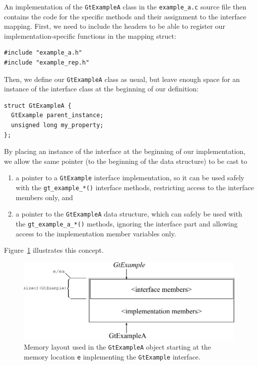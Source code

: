 \documentclass[11pt,final]{article}
\newcommand{\keyword}[1]{\lstinline{#1}}
\begin{document}
An implementation of the \keyword{GtExampleA} class in the \keyword{example_a.c}
source file then contains the code for the specific methods and their assignment
to the interface mapping. First, we need to include the headers to be able to
register our implementation-specific functions in the mapping struct:

\begin{lstlisting}
#include "example_a.h"
#include "example_rep.h"
\end{lstlisting}

Then, we define our \keyword{GtExampleA} class as usual, but leave enough space
for an instance of the interface class at the beginning of our definition:

\begin{lstlisting}
struct GtExampleA {
  GtExample parent_instance;
  unsigned long my_property;
};
\end{lstlisting}

By placing an instance of the interface at the beginning of our implementation,
we allow the same pointer (to the beginning of the data structure) to be cast to
\begin{enumerate}
\item
a pointer to a \keyword{GtExample} interface implementation, so it can be used
safely with the \keyword{gt_example_*()} interface methods, restricting access
to the interface members only, and
\item
a pointer to the \keyword{GtExampleA} data structure, which can safely be used
with the \keyword{gt_example_a_*()} methods, ignoring the interface part and
allowing access to the implementation member variables only.
\end{enumerate}
Figure~\ref{fig:interfacememlayout} illustrates this concept.

\begin{figure}
\begin{center}
\includegraphics[width=.7\textwidth]{mlayout}
\end{center}
\caption{Memory layout used in the \keyword{GtExampleA} object starting at the
 memory location \keyword{e} implementing the \keyword{GtExample} interface.}
\label{fig:interfacememlayout}
\end{figure}
\end{document}
